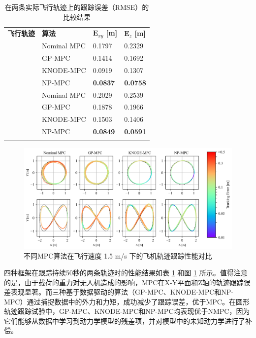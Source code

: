 \documentclass[lang=chs, degree=master, blindreview=false, winfonts=true]{yanputhesis}
\begin{document}
\renewcommand\arraystretch{1.15}
\begin{table}[htb!]
    \centering
    \caption{在两条实际飞行轨迹上的跟踪误差（RMSE）的比较结果}
    \label{table_xyz}
    \renewcommand\arraystretch{1.5} %
    \begin{tabular}{m{2.2cm}<{\centering} m{2.5cm}<{\centering} m{2.2cm}<{\centering} m{2.2cm}<{\centering}}
        \Xhline{1.pt}
        \textbf{飞行轨迹} & \textbf{算法} & \textbf{$\bm E_{xy}$ [m]} & \textbf{$\bm E_z$ [m]} \\
        \Xhline{1.pt}
        & Nominal MPC & 0.1797 & 0.2329 \\
        \multirow{2}{2.2cm}{\centering {圆}} & GP-MPC & 0.1414 & 0.1692 \\
        & KNODE-MPC & {0.0919} & {0.1307} \\
        & NP-MPC & \textbf{0.0837} & \textbf{0.0758} \\
        \hline
        & Nominal MPC & 0.2029 & 0.2539 \\
        \multirow{2}{2.2cm}{\centering {双纽线}} & GP-MPC & 0.1878 & 0.1966 \\
        & KNODE-MPC & {0.1503} & {0.1406} \\
        & NP-MPC & \textbf{0.0849} & \textbf{0.0591} \\
        \hline
        \Xhline{1.pt}
    \end{tabular}    
\end{table}
\begin{figure}[hbt!]
	\centering
	\includegraphics[width=38pc]{picture/kk/color.png} 
	\caption{不同MPC算法在飞行速度 1.5 m/s 下的飞机轨迹跟踪性能对比} 
	\label{color}
\end{figure}
四种框架在跟踪持续50秒的两条轨迹时的性能结果如表 \ref{table_xyz} 和图 \ref{color} 所示。值得注意的是，由于载荷的重力对无人机造成的影响，MPC在X-Y平面和Z轴的轨迹跟踪误差表现显著。而三种基于数据驱动的算法（GP-MPC、KNODE-MPC和NP-MPC）通过捕捉数据中的外力和力矩，成功减少了跟踪误差，优于MPC。在圆形轨迹跟踪试验中，GP-MPC、KNODE-MPC和NP-MPC均表现优于NMPC，因为它们能够从数据中学习到动力学模型的残差项，并对模型中的未知动力学进行了补偿。
\end{document}
